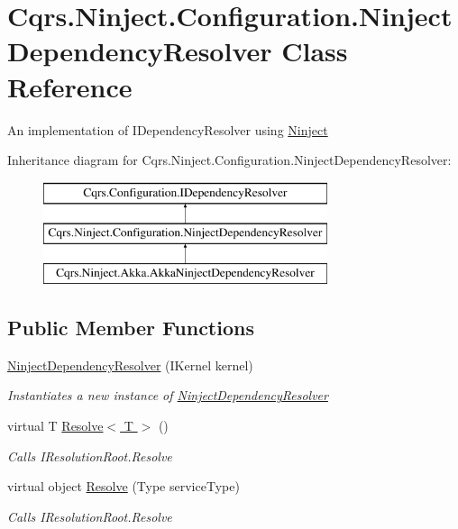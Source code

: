 \hypertarget{classCqrs_1_1Ninject_1_1Configuration_1_1NinjectDependencyResolver}{}\section{Cqrs.\+Ninject.\+Configuration.\+Ninject\+Dependency\+Resolver Class Reference}
\label{classCqrs_1_1Ninject_1_1Configuration_1_1NinjectDependencyResolver}


An implementation of I\+Dependency\+Resolver using \hyperlink{namespaceCqrs_1_1Ninject}{Ninject}  


Inheritance diagram for Cqrs.\+Ninject.\+Configuration.\+Ninject\+Dependency\+Resolver\+:\begin{figure}[H]
\begin{center}
\leavevmode
\includegraphics[height=3.000000cm]{classCqrs_1_1Ninject_1_1Configuration_1_1NinjectDependencyResolver}
\end{center}
\end{figure}
\subsection*{Public Member Functions}
\begin{DoxyCompactItemize}
\item 
\hyperlink{classCqrs_1_1Ninject_1_1Configuration_1_1NinjectDependencyResolver_a4fcafd900ce217f2da9c703a0c2413f8_a4fcafd900ce217f2da9c703a0c2413f8}{Ninject\+Dependency\+Resolver} (I\+Kernel kernel)
\begin{DoxyCompactList}\small\item\em Instantiates a new instance of \hyperlink{classCqrs_1_1Ninject_1_1Configuration_1_1NinjectDependencyResolver}{Ninject\+Dependency\+Resolver} \end{DoxyCompactList}\item 
virtual T \hyperlink{classCqrs_1_1Ninject_1_1Configuration_1_1NinjectDependencyResolver_a35cbb03e98326a3d10ba86c427148b3c_a35cbb03e98326a3d10ba86c427148b3c}{Resolve$<$ T $>$} ()
\begin{DoxyCompactList}\small\item\em Calls I\+Resolution\+Root.\+Resolve \end{DoxyCompactList}\item 
virtual object \hyperlink{classCqrs_1_1Ninject_1_1Configuration_1_1NinjectDependencyResolver_aef2a2be58a2562a349572e9946cd2930_aef2a2be58a2562a349572e9946cd2930}{Resolve} (Type service\+Type)
\begin{DoxyCompactList}\small\item\em Calls I\+Resolution\+Root.\+Resolve \end{DoxyCompactList}\end{DoxyCompactItemize}
